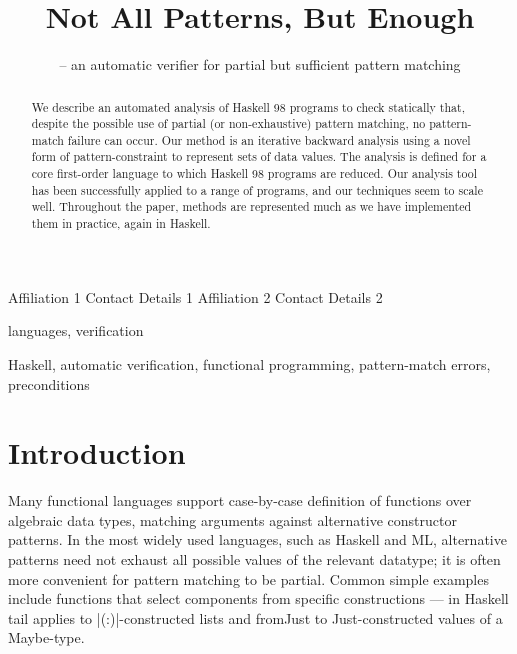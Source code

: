 \documentclass[preprint]{sigplanconf}
\newcommand{\C}[1]{\textsf{#1}}
\newcommand{\anon}[2]{#2}
\begin{document}
\copyrightdata{[to be supplied]}

\titlebanner{} %
\preprintfooter{}   %

\title{Not All Patterns, But Enough}
\subtitle{ -- an automatic verifier for partial but sufficient pattern matching}

\authorinfo{\anon{Neil Mitchell}{Author 1}}
           {\anon{University of York, UK - ndm}{Affiliation 1}}
           {Contact Details 1}
\authorinfo{\anon{Colin Runciman}{Author 2}}
           {\anon{University of York, UK - colin}{Affiliation 2}}
           {Contact Details 2}

\maketitle

\begin{abstract}
We describe an automated analysis of Haskell 98 programs to check
statically that, despite the possible use of partial (or non-exhaustive)
pattern matching, no pattern-match failure can occur.  Our method is an
iterative backward analysis using a novel form of pattern-constraint
to represent sets of data values.  The analysis is defined for a
core first-order language to which Haskell 98 programs are reduced.
Our analysis tool has been successfully applied to a range of programs,
and our techniques seem to scale well.  Throughout the paper, methods
are represented much as we have implemented them in practice, again in Haskell.
\end{abstract}


\terms
languages, verification

\keywords
Haskell, automatic verification, functional programming, pattern-match errors, preconditions

\section{Introduction}
\label{sec:introduction}

Many functional languages support case-by-case definition of functions
over algebraic data types, matching arguments against alternative
constructor patterns.  In the most widely used languages, such as Haskell
and ML, alternative patterns need not exhaust all possible values of
the relevant datatype; it is often more convenient for pattern matching
to be partial.  Common simple examples include functions that select
components from specific constructions --- in Haskell \C{tail} applies
to |(:)|-constructed lists and \C{fromJust} to \C{Just}-constructed values of
a \C{Maybe}-type.
\end{document}
